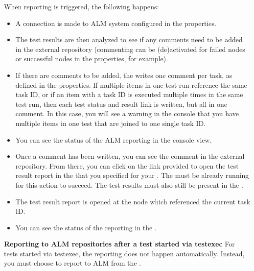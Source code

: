 When reporting is triggered, the following happens:
\begin{itemize}
\item A connection is made to ALM system configured in the \gdproject{} properties. 
\item The test results are then analyzed to see if any comments need to be added in the external repository (commenting can be (de)activated for failed nodes or successful nodes in the \gdproject{} properties, for example). 
\item If there are comments to be added, the \ite{} writes one comment per task, as defined in the \gdproject{} properties. If multiple items in one test run reference the same task ID, or if an item with a task ID is executed multiple times in the same test run,  then each test status and result link is written, but all in one comment. In this case, you will see a warning in the console that you have multiple items in one test that are joined to one single task ID.
\item You can see the status of the ALM reporting in the console view. 
\item Once a comment has been written, you can see the comment in the external repository. From there, you can click on the link provided to open the test result report in the \dash{} that you specified for your \gdproject{}. The \dash{} must be already running for this action to succeed. The test results must also still be present in the \gddb{} .
\item The test result report is opened at the node which referenced the current task ID. 
\item You can see the status of the reporting in the \gdtestsummaryview{} .
\end{itemize}

\textbf{Reporting to ALM repositories after a test started via testexec}
\label{TasksALMReportTestExec}
For tests started via testexec, the reporting does not happen automatically. Instead, you must choose to report to ALM from the \gdtestsummaryview{}.


